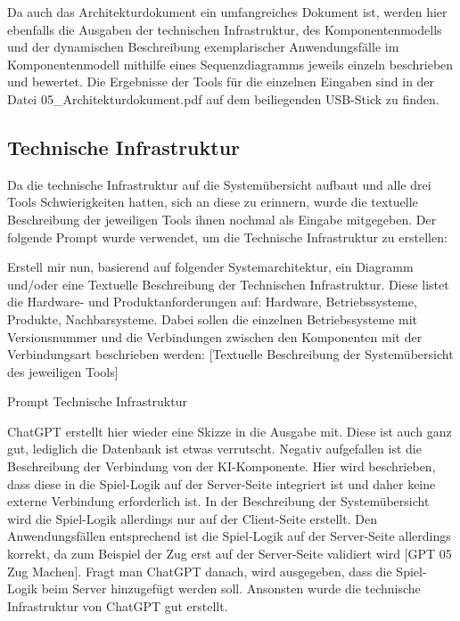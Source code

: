 Da auch das Architekturdokument ein umfangreiches Dokument ist, werden hier ebenfalls die Ausgaben der technischen Infrastruktur, des 
Komponentenmodells und der dynamischen Beschreibung exemplarischer Anwendungsfälle im Komponentenmodell mithilfe eines Sequenzdiagramms 
jeweils einzeln beschrieben und bewertet. Die Ergebnisse der Tools für die einzelnen Eingaben sind in der Datei 05\_Architekturdokument.pdf 
auf dem beiliegenden USB-Stick zu finden.

\subsection*{Technische Infrastruktur}

Da die technische Infrastruktur auf die Systemübersicht aufbaut und alle drei Tools Schwierigkeiten hatten, sich an diese zu erinnern, wurde 
die textuelle Beschreibung der jeweiligen Tools ihnen nochmal als Eingabe mitgegeben. Der folgende Prompt wurde verwendet, um die Technische 
Infrastruktur zu erstellen:

\begin{prompt}[H]
    \begin{tcolorbox}[colback=gray!20, colframe=gray!20, boxrule=0pt, sharp corners] 
        Erstell mir nun, basierend auf folgender Systemarchitektur, ein Diagramm und/oder eine Textuelle Beschreibung der Technischen Infrastruktur. 
        Diese listet die Hardware- und Produktanforderungen auf: Hardware, Betriebssysteme, Produkte, Nachbarsysteme. Dabei sollen die einzelnen 
        Betriebssysteme mit Versionsnummer und die Verbindungen zwischen den Komponenten mit der Verbindungsart beschrieben werden: [Textuelle 
        Beschreibung der Systemübersicht des jeweiligen Tools]
        \vfill
    \end{tcolorbox}
    \caption{Prompt Technische Infrastruktur}
    \label{Prompt Technische Infrastruktur}
\end{prompt}

ChatGPT erstellt hier wieder eine Skizze in die Ausgabe mit. Diese ist auch ganz gut, lediglich die Datenbank ist etwas verrutscht. Negativ aufgefallen 
ist die Beschreibung der Verbindung von der KI-Komponente. Hier wird beschrieben, dass diese in die Spiel-Logik auf der Server-Seite integriert ist und 
daher keine externe Verbindung erforderlich ist. In der Beschreibung der Systemübersicht wird die Spiel-Logik allerdings nur auf der Client-Seite erstellt. 
Den Anwendungsfällen entsprechend ist die Spiel-Logik auf der Server-Seite allerdings korrekt, da zum Beispiel der Zug erst auf der Server-Seite validiert 
wird [GPT 05 Zug Machen]. Fragt man ChatGPT danach, wird ausgegeben, dass die Spiel-Logik beim Server hinzugefügt werden soll. Ansonsten wurde die 
technische Infrastruktur von ChatGPT gut erstellt.

